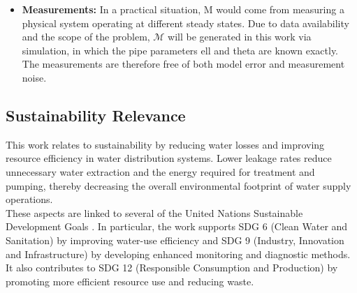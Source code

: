 \begin{itemize}
The main analysis assumes idealized conditions, no modeling or measurement errors, and that the number of leaks is known. The aim is to isolate the problem's fundamental theoretical properties and limitations. This provides insight into the underlying challenges that remain relevant under non-ideal assumptions, since the limitations of the ideal case also constrain more realistic, complex scenarios.\\

For completeness, a brief extension in \autoref{sec:n_not_known} considers the case where the number of leaks is unknown, and Sections~\ref{sec:mod_err} and~\ref{sec:meas_err} examine the impact of model and measurement errors. For space reasons, only modeling errors in \gls{theta} are considered, since it is assumed to be the most difficult parameter to estimate in practice.\\

\item \textbf{Measurements:}
In a practical situation, \gls{M} would come from measuring a physical system operating at different steady states. Due to data availability and the scope of the problem, $\mathcal{M}$ will be generated in this work via simulation, in which the pipe parameters \gls{ell} and \gls{theta} are known exactly. The measurements are therefore free of both model error and measurement noise.
\end{itemize}

\subsection{Sustainability Relevance}

This work relates to sustainability by reducing water losses and improving resource efficiency in water distribution systems. Lower leakage rates reduce unnecessary water extraction and the energy required for treatment and pumping, thereby decreasing the overall environmental footprint of water supply operations.\\

These aspects are linked to several of the United Nations Sustainable Development Goals \cite{un_goals}. In particular, the work supports SDG 6 (Clean Water and Sanitation) by improving water-use efficiency and SDG 9 (Industry, Innovation and Infrastructure) by developing enhanced monitoring and diagnostic methods. It also contributes to SDG 12 (Responsible Consumption and Production) by promoting more efficient resource use and reducing waste.

